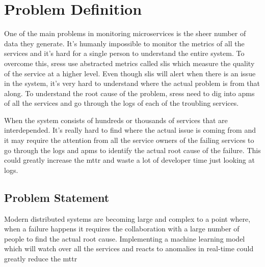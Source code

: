 \section{Problem Definition}

One of the main problems in monitoring microservices is the sheer number of data they generate. It's humanly impossible to monitor the metrics of all the services and it's hard for a single person to understand the entire system. To overcome this, \acp{sres} use abstracted metrics called \acp{sli} which measure the quality of the service at a higher level. Even though \acp{sli} will alert when there is an issue in the system, it's very hard to understand where the actual problem is from that along. To understand the root cause of the problem, \acp{sres} need to dig into \acp{apm} of all the services and go through the logs of each of the troubling services.

When the system consists of hundreds or thousands of services that are interdepended. It's really hard to find where the actual issue is coming from and it may require the attention from all the service owners of the failing services to go through the logs and \acp{apm} to identify the actual root cause of the failure. This could greatly increase the \ac{mttr} and waste a lot of developer time just looking at logs.

\subsection{Problem Statement}

Modern distributed systems are becoming large and complex to a point where, when a failure happens it requires the collaboration with a large number of people to find the actual root cause.  Implementing a machine learning model which will watch over all the services and reacts to anomalies in real-time could greatly reduce the \ac{mttr}